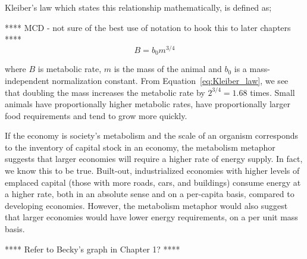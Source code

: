Kleiber's law which states this relationship mathematically,
is defined as;

**** MCD - not sure of the best use of notation to hook this to later chapters ****
\begin{equation}\label{eq:Kleiber_law}
B = b_{0} m^{3/4}
\end{equation}

\noindent{}where 
$B$ is metabolic rate,
$m$ is the mass of the animal and
$b_{0}$ is a mass-independent normalization constant.
From Equation~\ref{eq:Kleiber_law},
we see that doubling the mass increases the metabolic rate by
$2^{3/4} = 1.68$ times.
Small animals have proportionally higher metabolic rates,
have proportionally larger food requirements and tend to grow more quickly.

If the economy is society's metabolism and 
the scale of an organism corresponds to the inventory 
of capital stock in an economy, 
the metabolism metaphor suggests that larger economies 
will require a higher rate of energy supply.
In fact, we know this to be true.
Built-out, industrialized economies with higher levels of emplaced capital
(those with more roads, cars, and buildings)
consume energy at a higher rate, both in an absolute sense and on a per-capita basis,
compared to developing economies.
However, the metabolism metaphor would also suggest that 
larger economies would have lower energy requirements, 
on a per unit mass basis.

**** Refer to Becky's graph in Chapter 1? ****

